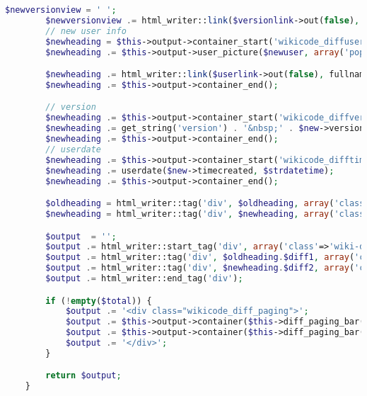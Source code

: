 \begin{lstlisting}[language=PHP]
        $newversionview = ' ';
        $newversionview .= html_writer::link($versionlink->out(false), get_string('view', 'wikicode'), array('class' => 'wikicode_diffview'));
        // new user info
        $newheading = $this->output->container_start('wikicode_diffuserright');
        $newheading .= $this->output->user_picture($newuser, array('popup' => true));

        $newheading .= html_writer::link($userlink->out(false), fullname($newuser), array('class' => 'notunderlined'));
        $newheading .= $this->output->container_end();

        // version
        $newheading .= $this->output->container_start('wikicode_diffversion');
        $newheading .= get_string('version') . '&nbsp;' . $new->version . $newversionview;
        $newheading .= $this->output->container_end();
        // userdate
        $newheading .= $this->output->container_start('wikicode_difftime');
        $newheading .= userdate($new->timecreated, $strdatetime);
        $newheading .= $this->output->container_end();

        $oldheading = html_writer::tag('div', $oldheading, array('class'=>'wiki-diff-heading header clearfix'));
        $newheading = html_writer::tag('div', $newheading, array('class'=>'wiki-diff-heading header clearfix'));

        $output  = '';
        $output .= html_writer::start_tag('div', array('class'=>'wiki-diff-container clearfix'));
        $output .= html_writer::tag('div', $oldheading.$diff1, array('class'=>'wiki-diff-leftside'));
        $output .= html_writer::tag('div', $newheading.$diff2, array('class'=>'wiki-diff-rightside'));
        $output .= html_writer::end_tag('div');

        if (!empty($total)) {
            $output .= '<div class="wikicode_diff_paging">';
            $output .= $this->output->container($this->diff_paging_bar(1, $new->version - 1, $old->version, $CFG->wwwroot . '/mod/wikicode/diff.php?pageid=' . $pageid . '&amp;comparewith=' . $new->version . '&amp;', 'compare', false, true), 'wikicode_diff_oldpaging');
            $output .= $this->output->container($this->diff_paging_bar($old->version + 1, $total, $new->version, $CFG->wwwroot . '/mod/wikicode/diff.php?pageid=' . $pageid . '&amp;compare=' . $old->version . '&amp;', 'comparewith', false, true), 'wikicode_diff_newpaging');
            $output .= '</div>';
        }

        return $output;
    }


\end{lstlisting}
